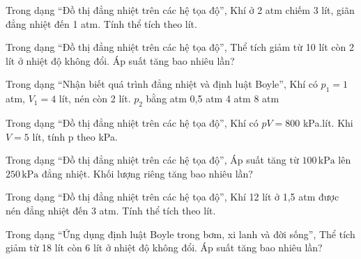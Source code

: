 \begin{ex}
Trong dạng “Đồ thị đẳng nhiệt trên các hệ tọa độ”, Khí ở 2 atm chiếm 3 lít, giãn đẳng nhiệt đến 1 atm. Tính thể tích theo lít.
\end{ex}

\begin{ex}
Trong dạng “Đồ thị đẳng nhiệt trên các hệ tọa độ”, Thể tích giảm từ 10 lít còn 2 lít ở nhiệt độ không đổi. Áp suất tăng bao nhiêu lần?
\end{ex}

\begin{ex}
Trong dạng “Nhận biết quá trình đẳng nhiệt và định luật Boyle”, Khí có $p_1=1$ atm, $V_1=4$ lít, nén còn 2 lít. $p_2$ bằng
\choice
{ atm}
{0,5 atm}
{4 atm}
{8 atm}
\end{ex}

\begin{ex}
Trong dạng “Đồ thị đẳng nhiệt trên các hệ tọa độ”, Khí có $pV=800$ kPa.lít. Khi $V=5$ lít, tính p theo kPa.
\end{ex}

\begin{ex}
Trong dạng “Đồ thị đẳng nhiệt trên các hệ tọa độ”, Áp suất tăng từ $100\,\text{kPa}$ lên $250\,\text{kPa}$ đẳng nhiệt. Khối lượng riêng tăng bao nhiêu lần?
\end{ex}

\begin{ex}
Trong dạng “Đồ thị đẳng nhiệt trên các hệ tọa độ”, Khí 12 lít ở 1,5 atm được nén đẳng nhiệt đến 3 atm. Tính thể tích theo lít.
\end{ex}

\begin{bt}
Trong dạng “Ứng dụng định luật Boyle trong bơm, xi lanh và đời sống”, Thể tích giảm từ 18 lít còn 6 lít ở nhiệt độ không đổi. Áp suất tăng bao nhiêu lần?
\end{bt}

